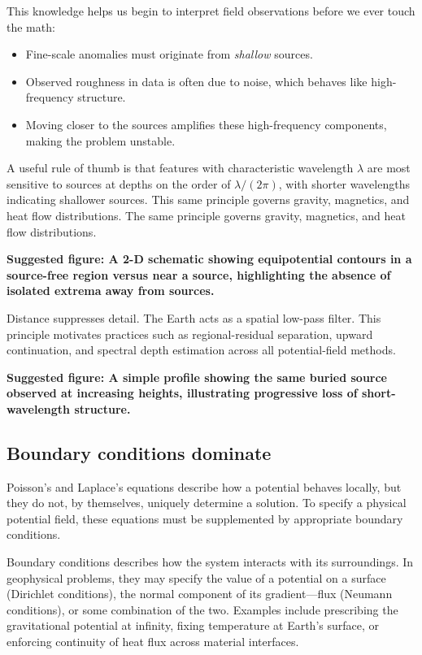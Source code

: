 This knowledge helps us begin to interpret field observations before we ever touch the math:
\begin{itemize}
    \item Fine-scale anomalies must originate from \emph{shallow} sources.
    \item Observed roughness in data is often due to noise, which behaves like high-frequency structure.
    \item Moving closer to the sources amplifies these high-frequency components, making the problem unstable.
\end{itemize}
A useful rule of thumb is that features with characteristic wavelength $\lambda$ are most sensitive to sources at depths on the order of $\lambda / (2\pi)$, with shorter wavelengths indicating shallower sources.  This same principle governs gravity, magnetics, and heat flow distributions.  The same principle governs gravity, magnetics, and heat flow distributions.

\textbf{Suggested figure:
A 2-D schematic showing equipotential contours in a source-free region versus near a source, highlighting the absence of isolated extrema away from sources.}

Distance suppresses detail. The Earth acts as a spatial low-pass filter.  This principle motivates practices such as regional-residual separation, upward continuation, and spectral depth estimation across all potential-field methods.

\textbf{Suggested figure:
A simple profile showing the same buried source observed at increasing heights, illustrating progressive loss of short-wavelength structure.}

\subsection{Boundary conditions dominate}

Poisson's and Laplace's equations describe how a potential behaves locally, but they do not, by themselves, uniquely determine a solution. To specify a physical potential field, these equations must be supplemented by appropriate boundary conditions.

Boundary conditions describes how the system interacts with its surroundings. In geophysical problems, they may specify the value of a potential on a surface (Dirichlet conditions), the normal component of its gradient---flux (Neumann conditions), or some combination of the two. Examples include prescribing the gravitational potential at infinity, fixing temperature at Earth's surface, or enforcing continuity of heat flux across material interfaces.

